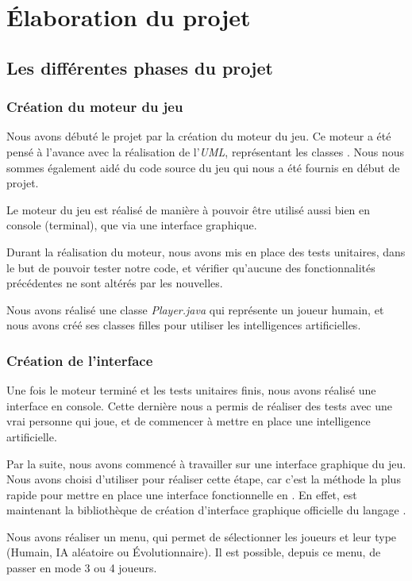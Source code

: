 \section{Élaboration du projet}

\subsection{Les différentes phases du projet}
	\subsubsection{Création du moteur du jeu}
		
		Nous avons débuté le projet par la création du moteur du jeu.
		Ce moteur a été pensé à l'avance avec la réalisation de l'\emph{UML},
		représentant les classes \java.
		Nous nous sommes également aidé du code source du jeu qui nous a été fournis
		en début de projet.
		
		Le moteur du jeu est réalisé de manière à pouvoir être utilisé aussi bien en
		console (terminal), que via une interface graphique.
		
		Durant la réalisation du moteur, nous avons mis en place des tests unitaires,
		dans le but de pouvoir tester notre code, et vérifier qu'aucune des
		fonctionnalités précédentes ne sont altérés par les nouvelles.
		
		Nous avons réalisé une classe \emph{Player.java} qui représente un joueur humain,
		et nous avons créé ses classes filles pour utiliser les intelligences artificielles.
		
	\subsubsection{Création de l'interface}
	
		Une fois le moteur terminé et les tests unitaires finis, nous avons réalisé une interface en console.
		Cette dernière nous a permis de réaliser des tests avec une vrai personne qui joue, et de 
		commencer à mettre en place une intelligence artificielle.
		
		Par la suite, nous avons commencé à travailler sur une interface graphique
		du jeu. Nous avons choisi d'utiliser \fx pour réaliser cette étape, car c'est
		la méthode la plus rapide pour mettre en place une interface fonctionnelle en \java.
		En effet, \fx est maintenant la bibliothèque de création d'interface graphique officielle du langage \java.
		
		Nous avons réaliser un menu, qui permet de sélectionner les joueurs et leur type
		(Humain, IA aléatoire ou Évolutionnaire). Il est possible, depuis ce menu, de
		passer en mode 3 ou 4 joueurs.
		
